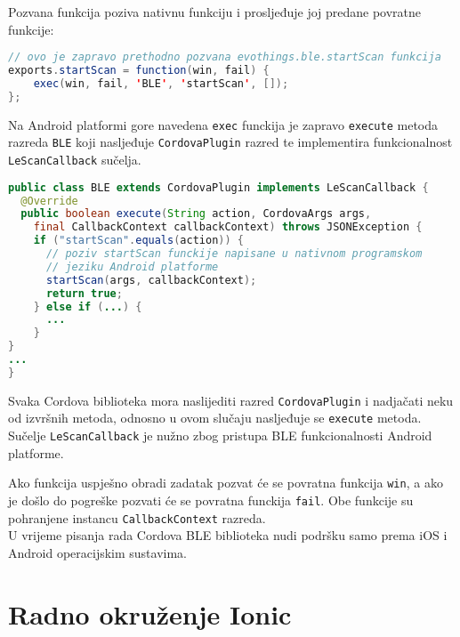 Pozvana funkcija poziva nativnu funkciju i prosljeđuje joj predane povratne funkcije:
\begin{lstlisting}[language=java, morekeywords={var,function}]
// ovo je zapravo prethodno pozvana evothings.ble.startScan funkcija
exports.startScan = function(win, fail) {
	exec(win, fail, 'BLE', 'startScan', []);
};
\end{lstlisting}

Na Android platformi gore navedena \texttt{exec} funckija je zapravo \texttt{execute} metoda razreda \texttt{BLE} koji nasljeđuje \texttt{CordovaPlugin} razred te implementira funkcionalnost \texttt{LeScanCallback} sučelja. 
\begin{lstlisting}[language=java]
public class BLE extends CordovaPlugin implements LeScanCallback {
  @Override
  public boolean execute(String action, CordovaArgs args, 
    final CallbackContext callbackContext) throws JSONException {
    if ("startScan".equals(action)) {
      // poziv startScan funckije napisane u nativnom programskom
      // jeziku Android platforme
      startScan(args, callbackContext); 
      return true;
    } else if (...) {
      ...
    }
}
...
}
\end{lstlisting}

Svaka Cordova biblioteka mora naslijediti razred \texttt{CordovaPlugin} i nadjačati neku od   izvršnih metoda, odnosno u ovom slučaju nasljeđuje se \texttt{execute} metoda. 
Sučelje \texttt{LeScanCallback} je nužno zbog pristupa BLE funkcionalnosti Android platforme.

Ako funkcija uspješno obradi zadatak pozvat će se povratna funkcija \texttt{win}, a ako je došlo do pogreške pozvati će se povratna funckija \texttt{fail}. 
Obe funkcije su pohranjene instancu \texttt{CallbackContext} razreda.
\\

U vrijeme pisanja rada Cordova BLE biblioteka nudi podršku samo prema iOS i Android operacijskim sustavima.

\section{Radno okruženje Ionic}

